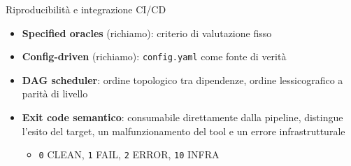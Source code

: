 
\begin{frame}{Riproducibilità e integrazione CI/CD}
  \begin{itemize}
    \item \textbf{Specified oracles} (richiamo): criterio di valutazione \alert{fisso}

    \item \textbf{Config-driven} (richiamo): \texttt{config.yaml} come fonte di verità

    \item \textbf{DAG scheduler}: \alert{ordine topologico} tra dipendenze, \alert{ordine lessicografico} a parità di livello

    \item \textbf{Exit code semantico}: \alert{consumabile direttamente dalla pipeline}, distingue l'esito del target, un malfunzionamento del tool e un errore infrastrutturale
          \begin{itemize}
            \item {\scriptsize \texttt{0} CLEAN, \texttt{1} FAIL, \texttt{2} ERROR, \texttt{10} INFRA}
          \end{itemize}
  \end{itemize}
\end{frame}